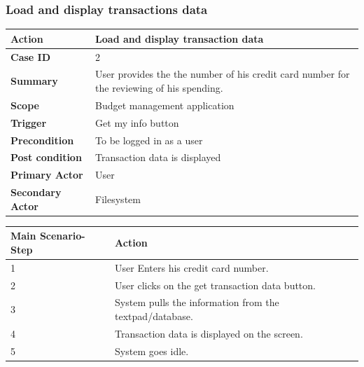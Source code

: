 \documentclass[letterpaper]{article}
\begin{document}
		\subsubsection{Load and display transactions data}
		
		\begin{center}
	        \begin{tabular}{ | m{3.5cm} | m{7.5cm}| } 
	            \hline
	            \textbf{Action} & Load and display transaction data \\ 
	            \hline
	            \textbf{Case ID} & 2 \\ 
	            \hline
	            \textbf{Summary} & User provides the the number of his credit card number for the reviewing of his spending. \\
	            \hline
	            \textbf{Scope} & Budget management application \\ 
	            \hline
	            \textbf{Trigger} & Get my info button \\
	            \hline
	            \textbf{Precondition} & To be logged in as a user \\ 
	            \hline
	            \textbf{Post condition} & Transaction data is displayed \\ 
	            \hline
	            \textbf{Primary Actor} & User \\ 
	            \hline
	            \textbf{Secondary Actor} & Filesystem \\ 
	            \hline
	        \end{tabular}
        
        	\vspace{2mm}
        
           	\begin{tabular}{ | m{3.5cm} | m{7.5cm}| } 
           		\hline
	            \textbf{Main Scenario-Step} & \textbf{Action} \\ 
	            \hline
	            1 & User Enters his credit card number. \\ 
	            \hline
	            2 & User clicks on the get transaction data button. \\ 
	            \hline
	            3 & System pulls the information from the textpad/database. \\ 
	            \hline
	            4 & Transaction data is displayed on the screen. \\ 
	            \hline
	            5 & System goes idle. \\ 
	            \hline
	        \end{tabular}
        \end{center}
        
\end{document}
